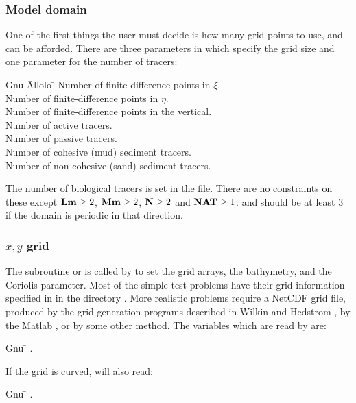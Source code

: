 \subsubsection{Model domain}
\label{Muddy}
One of the first things the user must decide is how many grid points
to use, and can be afforded.  There are three parameters in
 which specify the grid size and one parameter for the
number of tracers:
\begin{tabbing}
  Gnu \= Allolo \= \kill
  \>  \> Number of finite-difference points in $\xi$. \\
  \>  \> Number of finite-difference points in $\eta$. \\
  \>  \> Number of finite-difference points in the vertical. \\
  \>  \> Number of active tracers. \\
  \>  \> Number of passive tracers. \\
  \>  \> Number of cohesive (mud) sediment tracers. \\
  \>  \> Number of non-cohesive (sand) sediment tracers.
\end{tabbing}
The number of biological tracers is set in the  file.
There are no constraints on these except $\mbox{\bf Lm} \geq 2$, $\mbox{\bf Mm}
\geq 2$, $\mbox{\bf N} \geq 2$ and $\mbox{\bf NAT} \geq 1$.   and
 should be at least 3 if the domain is periodic in that
direction.

\subsubsection{$x,y$ grid}
The subroutine  or  is called by
 to set the grid arrays, the bathymetry, and the
Coriolis parameter.  Most of the simple test problems have their grid
information specified in  in the directory
.  More realistic problems require a NetCDF grid
file, produced by the grid generation programs described in Wilkin and
Hedstrom \cite{GRIDS}, by the Matlab , or by some
other method.  The variables which are read by  are:
\begin{tabbing}
  Gnu \= \kill
  \> .
\end{tabbing}
If the grid is curved,  will also read:
\begin{tabbing}
  Gnu \= \kill
  \> .
\end{tabbing}

